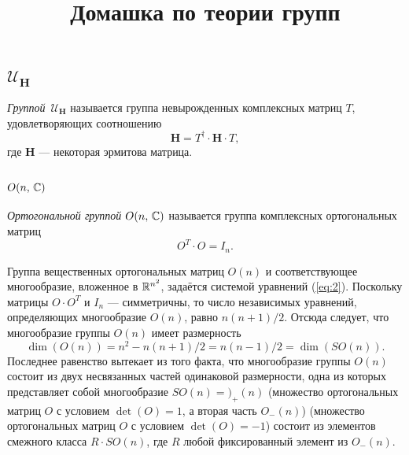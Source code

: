 \documentclass[a4paper,12pt]{article}
\title{Домашка по теории групп}
\begin{document}

\maketitle

\section{}
\subsection{$\mathcal{U}_\mathbf{H}$ }
\begin{dfn}
	\emph{Группой} $\,\mathcal{U}_\mathbf{H}$ называется группа невырожденных
	комплексных матриц $T$, удовлетворяющих соотношению
	\begin{equation}
		\mathbf{H}=T^\dag \cdot \mathbf{H} \cdot T
		\label{eq:1}
	,\end{equation}
	где $\mathbf{H}$ --- некоторая эрмитова матрица.
\end{dfn}
\subsection{$O(n,\, \mathbb{C} )$ }
\begin{dfn}
	\emph{Ортогональной группой $O(n,\,\mathbb{C})$} называется группа комплексных
	ортогональных
	матриц
	\begin{equation}
	O^T \cdot O = I_n
	\label{eq:2}
.\end{equation}
\end{dfn}

Группа вещественных ортогональных матриц $O(n)$ и  соответствующее
многообразие, вложенное в
$\mathbb{R}^{n^2}$, задаётся системой уравнений (\ref{eq:2}).
Поскольку матрицы $O \cdot O^T$ и $I_n$ --- симметричны, то число
независимых уравнений, определяющих многообразие $O (n)$, равно $n(n+1) /2$.
Отсюда следует, что многообразие группы $O(n)$ имеет размерность
\begin{equation}
	\dim (O(n)) = n^2 - n (n+1) /2=n(n-1) /2 = \dim (SO(n))	
	\label{eq:on}
.\end{equation}
Последнее равенство вытекает из того факта, что многообразие группы $O(n)$ 
состоит из двух несвязанных частей одинаковой размерности, одна из которых
представляет собой многообразие $SO(n)=)_+(n)$ (множество ортогональных матриц
$O$ с условием $\det (O)=1$, а вторая часть $O_-(n)$) (множество ортогональных
матриц $O$ с условием $\det (O)=-1$) состоит из элементов смежного класса
$R \cdot SO(n)$, где $R$ любой фиксированный элемент из $O_-(n)$.
\end{document}
